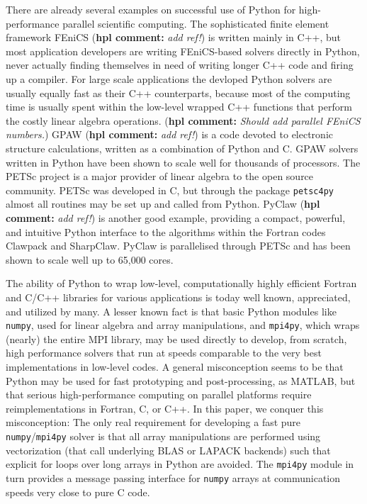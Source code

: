 \documentclass[11pt, oneside]{article}
\newcommand{\hpl}[1]{({\bf hpl comment:} \emph{#1})}
\begin{document}
There are already several examples on successful use of Python for
high-performance parallel scientific computing. The sophisticated
finite element framework FEniCS \hpl{add ref!} is written mainly in
C++, but most application developers are writing FEniCS-based solvers
directly in Python, never actually finding themselves in need of
writing longer C++ code and firing up a compiler. For large scale
applications the devloped Python solvers are usually equally fast as
their C++ counterparts, because most of the computing time is usually
spent within the low-level wrapped C++ functions that perform the
costly linear algebra operations. \hpl{Should add parallel FEniCS numbers.}
GPAW \hpl{add ref!} is a code devoted
to electronic structure calculations, written as a combination of
Python and C. GPAW solvers written in Python have been shown to scale
well for thousands of processors.  The PETSc project is a major
provider of linear algebra to the open source community. PETSc was
developed in C, but through the package \texttt{petsc4py} almost all
routines may be set up and called from Python. PyClaw \hpl{add ref!}
is another good example, providing a compact, powerful, and intuitive
Python interface to the algorithms within the Fortran codes Clawpack
and SharpClaw. PyClaw is parallelised through PETSc and has been shown
to scale well up to 65,000 cores.

The ability of Python to wrap low-level, computationally highly efficient Fortran and C/C++ libraries for various applications is today well known, appreciated, and utilized by many. A lesser known fact is that basic Python modules like \texttt{numpy}, used for linear algebra and array manipulations, and \texttt{mpi4py}, which wraps (nearly) the entire MPI library, may be used directly to develop, from scratch, high performance solvers that run at speeds comparable to the very best implementations in low-level codes. A general misconception seems to be that Python may be used for fast prototyping and post-processing, as MATLAB, but that serious high-performance computing on parallel platforms require reimplementations in Fortran, C, or C++. In this paper, we conquer this misconception: The only real requirement for developing a fast pure \texttt{numpy}/\texttt{mpi4py} solver is that all array manipulations are performed using vectorization (that call underlying BLAS or LAPACK backends) such that explicit for loops over long arrays in Python are avoided. The \texttt{mpi4py} module in turn provides a message passing interface for \texttt{numpy} arrays at communication speeds very close to pure C code.
\end{document}
